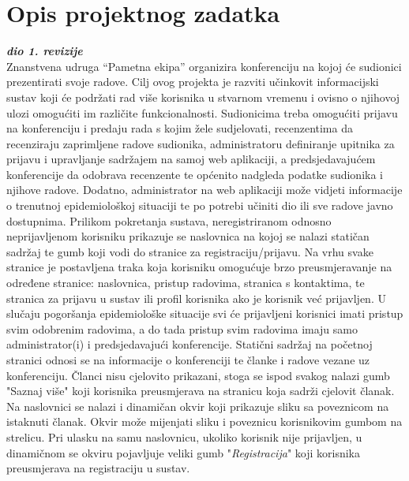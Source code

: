 \chapter{Opis projektnog zadatka}
		
		\textbf{\textit{dio 1. revizije}}\\

		Znanstvena udruga “Pametna ekipa” organizira konferenciju na kojoj će sudionici prezentirati svoje radove. Cilj ovog projekta je razviti učinkovit informacijski sustav koji će podržati rad više korisnika u stvarnom vremenu i ovisno o njihovoj ulozi omogućiti im različite funkcionalnosti. Sudionicima treba omogućiti prijavu na konferenciju i predaju rada s kojim žele sudjelovati, recenzentima da recenziraju zaprimljene radove sudionika, administratoru definiranje upitnika za prijavu i upravljanje sadržajem na samoj web aplikaciji, a predsjedavajućem konferencije da odobrava recenzente te općenito nadgleda podatke sudionika i njihove radove. Dodatno, administrator na web aplikaciji može vidjeti informacije o trenutnoj epidemiološkoj situaciji te po potrebi učiniti dio ili sve radove javno dostupnima.
		\newline
		\newline
		Prilikom pokretanja sustava, neregistriranom odnosno neprijavljenom korisniku prikazuje se naslovnica na kojoj se nalazi statičan sadržaj te gumb koji vodi do stranice za registraciju/prijavu. Na vrhu svake stranice  je postavljena traka koja korisniku omogućuje brzo preusmjeravanje na određene stranice: naslovnica, pristup radovima, stranica s kontaktima, te stranica za prijavu u sustav ili profil korisnika ako je korisnik već prijavljen. U slučaju pogoršanja epidemiološke situacije svi će prijavljeni korisnici imati pristup svim odobrenim radovima, a do tada pristup svim radovima imaju samo administrator(i) i predsjedavajući konferencije. Statični sadržaj na početnoj stranici odnosi se na informacije o konferenciji te članke i radove vezane uz konferenciju. Članci nisu cjelovito prikazani, stoga se ispod svakog nalazi gumb "Saznaj više" koji korisnika preusmjerava na stranicu koja sadrži cjelovit članak. Na naslovnici se nalazi i dinamičan okvir koji prikazuje sliku sa poveznicom na istaknuti članak. Okvir može mijenjati sliku i poveznicu korisnikovim gumbom na strelicu. Pri ulasku na samu naslovnicu, ukoliko korisnik nije prijavljen, u dinamičnom se okviru pojavljuje veliki gumb "\textit{Registracija}" koji korisnika preusmjerava na registraciju u sustav. 
		\newline
